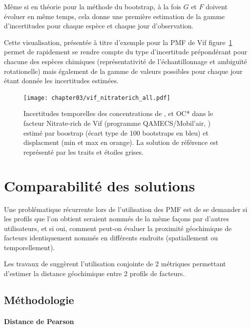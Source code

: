 Même si en théorie pour la méthode du bootstrap, à la fois $G$ et $F$ doivent
évoluer en même temps, cela donne une première estimation de la gamme d'incertitudes pour
chaque espèce et chaque jour d'observation.

Cette visualisation, présentée à titre d'exemple pour la PMF de Vif
figure~\ref{fig:chapter03/vif_nitraterich_all} permet de rapidement se rendre compte du
type d'incertitude prépondérant pour chacune des espèces chimiques (représentativité de
l'échantillonnage et ambiguïté rotationelle) mais également de la gamme de valeurs
possibles pour chaque jour étant donnée les incertitudes estimées.

\begin{figure}[ht]
    \centering
    \texttt{[image: chapter03/vif\_nitraterich\_all.pdf]}
    \caption{Incertitudes temporelles des concentrations de \PMdix, \NOt{} et OC* dans le
        facteur Nitrate-rich de Vif (programme QAMECS/Mobil'air,
        \cite{borlazaFinescaleinprep.}) estimé par boostrap (écart type de 100 bootstraps en bleu)
        et displacment (min et max en orange). La solution de référence est représenté par les
    traits et étoiles grises.}%
    \label{fig:chapter03/vif_nitraterich_all}
\end{figure}


\section{Comparabilité des solutions}%
\label{sub:comparabilité_des_solutions}

Une problématique récurrente lors de l'utilisation des PMF est de se demander si les
profils que l'on obtient seraient nommés de la même façons par d'autres utilisateurs, et
si oui, comment peut-on évaluer la proximité géochimique de facteurs identiquement nommés
en différents endroits (spatiallement ou temporellement).

Les travaux de \cite{belisNew2015a} suggèrent l'utilisation conjointe de 2
métriques permettant d'estimer la distance géochimique entre 2 profils de facteurs.

\subsection{Méthodologie}%
\label{sub:méthodologie}

\paragraph{Distance de Pearson}%
\label{par:distance_de_pearson}

